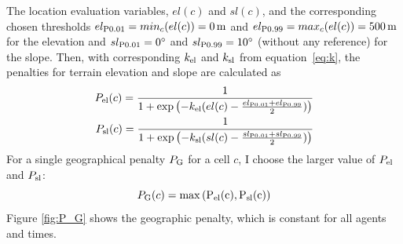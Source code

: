 The location evaluation variables, $el(c)$ and $sl(c)$, and the corresponding chosen thresholds $el_{\rm P0.01}=min_c(el(c))=0\, {\rm m}$ and $el_{\rm P0.99}=max_c(el(c)) = 500\, {\rm m}$ for the elevation and $sl_{\rm P0.01}=0^\circ$ and $sl_{\rm P0.99}=10^\circ$ (without any reference) for the slope. 
Then, with corresponding $k_{\rm el}$ and $k_{\rm sl}$ from equation~\ref{eq:k}, the penalties for terrain elevation and slope are calculated as 
\begin{eqnarray}
	P_{\text{el}}(c) = \frac{1}{1+\exp\left( - k_{\rm el} (el(c)-\frac{el_{\rm P0.01}+el_{\rm P0.99}}{2}) \right)}\\
	P_{\text{sl}}(c) = \frac{1}{1+\exp\left( - k_{\rm sl} (sl(c)-\frac{sl_{\rm P0.01}+sl_{\rm P0.99}}{2}) \right)}
\end{eqnarray}
For a single geographical penalty $P_{\rm G}$ for a cell $c$, I choose the larger value of $P_{\rm el}$ and $P_{\rm sl}$:
\begin{equation}
P_{\rm G}(c) = \rm{max}\left(P_\text{el}(c), P_\text{sl}(c) \right)
\end{equation}
Figure \ref{fig:P_G} shows the geographic penalty, which is constant for all agents and times.
		
